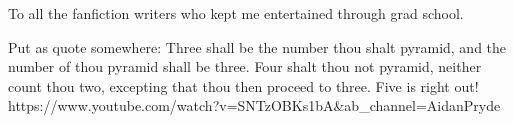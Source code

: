 To all the fanfiction writers who kept me entertained through grad school.

Put as quote somewhere:
Three shall be the number thou shalt pyramid, and the number of thou pyramid shall be three. Four shalt thou not pyramid, neither count thou two, excepting that thou then proceed to three. Five is right out!    https://www.youtube.com/watch?v=SNTzOBKs1bA&ab_channel=AidanPryde 